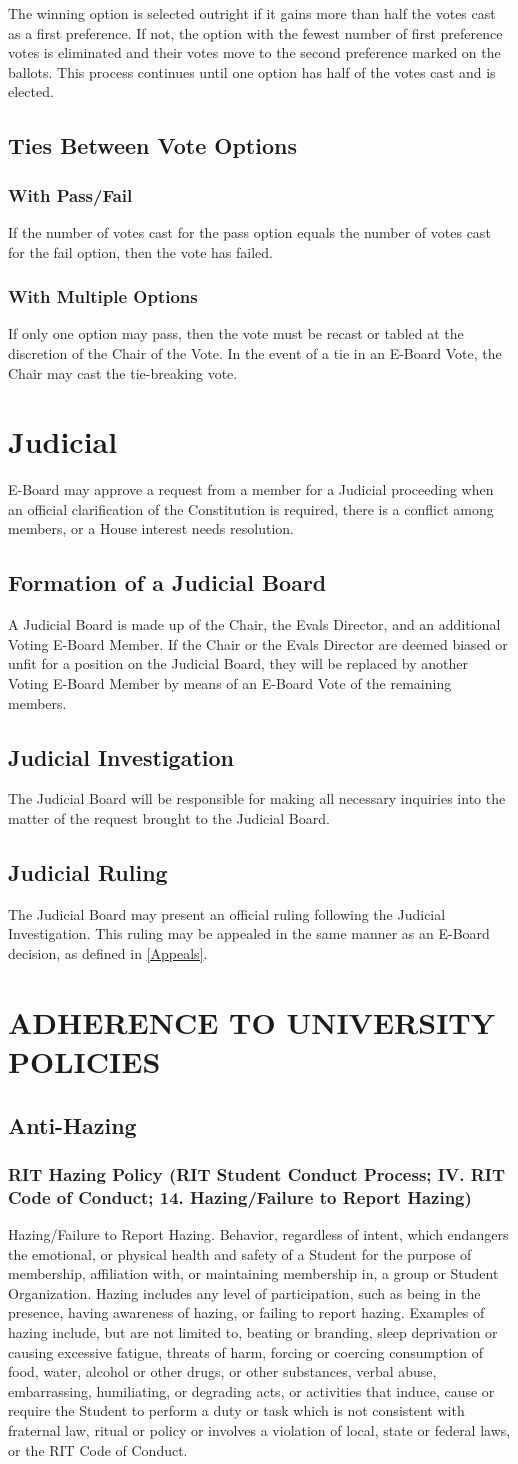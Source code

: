 \documentclass{article}
\newcommand{\article}[1]{\section{#1} \label{#1}}
\newcommand{\asection}[1]{\subsection{#1} \label{#1}}
\newcommand{\asubsection}[1]{\subsubsection{#1} \label{#1}}
\begin{document}
The winning option is selected outright if it gains more than half the votes cast as a first preference.
If not, the option with the fewest number of first preference votes is eliminated and their votes move to the second preference marked on the ballots.
This process continues until one option has half of the votes cast and is elected.

\asection{Ties Between Vote Options}

\asubsection{With Pass/Fail}
If the number of votes cast for the pass option equals the number of votes cast for the fail option, then the vote has failed.

\asubsection{With Multiple Options}
If only one option may pass, then the vote must be recast or tabled at the discretion of the Chair of the Vote.
In the event of a tie in an E-Board Vote, the Chair may cast the tie-breaking vote.

\article{Judicial}
E-Board may approve a request from a member for a Judicial proceeding when an official clarification of the Constitution is required, there is a conflict among members, or a House interest needs resolution.

\asection{Formation of a Judicial Board}
A Judicial Board is made up of the Chair, the Evals Director, and an additional Voting E-Board Member.
If the Chair or the Evals Director are deemed biased or unfit for a position on the Judicial Board, they will be replaced by another Voting E-Board Member by means of an E-Board Vote of the remaining members.

\asection{Judicial Investigation}
The Judicial Board will be responsible for making all necessary inquiries into the matter of the request brought to the Judicial Board.

\asection{Judicial Ruling}
The Judicial Board may present an official ruling following the Judicial Investigation.
This ruling may be appealed in the same manner as an E-Board decision, as defined in \ref{Appeals}.

\article{ADHERENCE TO UNIVERSITY POLICIES}

\asection{Anti-Hazing}

\asubsection{RIT Hazing Policy (RIT Student Conduct Process; IV. RIT Code of Conduct; 14. Hazing/Failure to Report
	Hazing)}
Hazing/Failure to Report Hazing.
Behavior, regardless of intent, which endangers the emotional, or physical health and safety of a Student for the purpose of membership, affiliation with, or maintaining membership in, a group or Student Organization. Hazing includes any level of participation, such as being in the presence, having awareness of hazing, or failing to report hazing.
Examples of hazing include, but are not limited to, beating or branding, sleep deprivation or causing excessive fatigue, threats of harm, forcing or coercing consumption of food, water, alcohol or other drugs, or other substances, verbal abuse, embarrassing, humiliating, or degrading acts, or activities that induce, cause or require the Student to perform a duty or task which is not consistent with fraternal law, ritual or policy or involves a violation of local, state or federal laws, or the RIT Code of Conduct.
\end{document}
